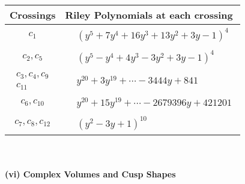 \documentclass[1p]{elsarticle_modified}
\theoremstyle{definition}
\begin{document}
\begin{tabular}{m{50pt}|m{274pt}}
Crossings & \hspace{64pt}Riley Polynomials at each crossing \\
\hline $$\begin{aligned}c_{1}\end{aligned}$$&$\begin{aligned}
&(y^5+7 y^4+16 y^3+13 y^2+3 y-1)^4
\end{aligned}$\\
\hline $$\begin{aligned}c_{2},c_{5}\end{aligned}$$&$\begin{aligned}
&(y^5- y^4+4 y^3-3 y^2+3 y-1)^4
\end{aligned}$\\
\hline $$\begin{aligned}c_{3},c_{4},c_{9}\\c_{11}\end{aligned}$$&$\begin{aligned}
&y^{20}+3 y^{19}+\cdots-3444 y+841
\end{aligned}$\\
\hline $$\begin{aligned}c_{6},c_{10}\end{aligned}$$&$\begin{aligned}
&y^{20}+15 y^{19}+\cdots-2679396 y+421201
\end{aligned}$\\
\hline $$\begin{aligned}c_{7},c_{8},c_{12}\end{aligned}$$&$\begin{aligned}
&(y^2-3 y+1)^{10}
\end{aligned}$\\
\hline
\end{tabular}\\~\\
\newpage\flushleft \textbf{(vi) Complex Volumes and Cusp Shapes}
\end{document}
